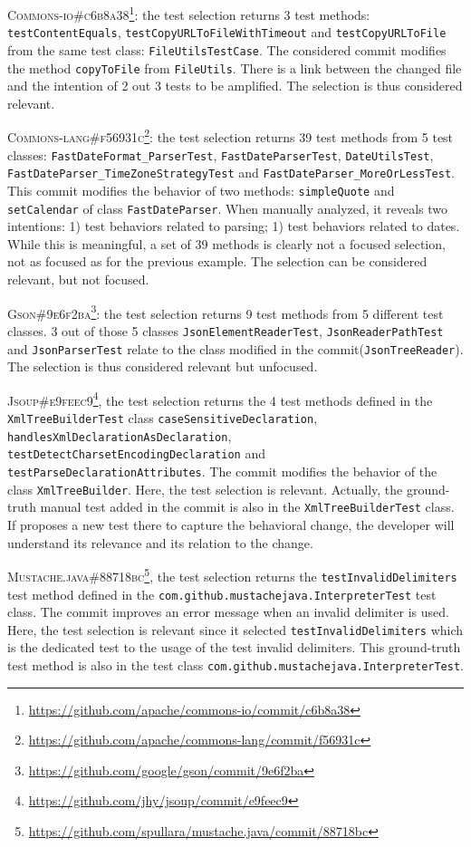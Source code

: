 \textsc{Commons-io\#c6b8a38}\footnote{\url{https://github.com/apache/commons-io/commit/c6b8a38}}: the test selection returns 3 test methods: \texttt{testContentEquals}, \texttt{testCopyURLToFileWithTimeout} and \texttt{testCopyURLToFile} from the same test class: \texttt{FileUtilsTestCase}.
The considered commit modifies the method \texttt{copyToFile} from \texttt{FileUtils}.
There is a link between the changed file and the intention of 2 out 3 tests to be amplified.
The selection is thus considered relevant.

\textsc{Commons-lang\#f56931c}\footnote{\url{https://github.com/apache/commons-lang/commit/f56931c}}: the test selection returns 39 test methods from 5 test classes: \texttt{FastDateFormat\_ParserTest}, \texttt{FastDateParserTest}, \texttt{DateUtilsTest}, \texttt{FastDateParser\_TimeZoneStrategyTest} and \texttt{FastDateParser\_MoreOrLessTest}.
This commit modifies the behavior of two methods: \texttt{simpleQuote} and \texttt{setCalendar} of class \texttt{FastDateParser}.
When manually analyzed, it reveals two intentions:
1) test behaviors related to parsing;
1) test behaviors related to dates.
While this is meaningful, a set of 39 methods is clearly not a focused selection, not as focused as for the previous example.
The selection can be considered relevant, but not focused.

\textsc{Gson\#9e6f2ba}\footnote{\url{https://github.com/google/gson/commit/9e6f2ba}}: the test selection returns 9 test methods from 5 different test classes.
3 out of those 5 classes \texttt{JsonElementReaderTest}, \texttt{JsonReaderPathTest} and \texttt{JsonParserTest} relate to the class modified in the commit(\texttt{JsonTreeReader}).
The selection is thus considered relevant but unfocused.

\textsc{Jsoup\#e9feec9}\footnote{\url{https://github.com/jhy/jsoup/commit/e9feec9}}, the test selection returns the 4 test methods defined in the \texttt{XmlTreeBuilderTest} class \texttt{caseSensitiveDeclaration}, \texttt{handlesXmlDeclarationAsDeclaration}, \texttt{testDetectCharsetEncodingDeclaration} and \texttt{testParseDeclarationAttributes}.
The commit modifies the behavior of the class \texttt{XmlTreeBuilder}.
Here, the test selection is relevant.
Actually, the ground-truth manual test added in the commit is also in the \texttt{XmlTreeBuilderTest} class.
If \DCI proposes a new test there to capture the behavioral change, the developer will understand its relevance and its relation to the change.

\textsc{Mustache.java\#88718bc}\footnote{\url{https://github.com/spullara/mustache.java/commit/88718bc}}, the test selection returns the \texttt{testInvalidDelimiters} test method defined in the \texttt{com.github.mustachejava.InterpreterTest} test class.
The commit improves an error message when an invalid delimiter is used.
Here, the test selection is relevant since it selected \texttt{testInvalidDelimiters} which is the dedicated test to the usage of the test invalid delimiters.
This ground-truth test method is also in the test class \texttt{com.github.mustachejava.InterpreterTest}.

